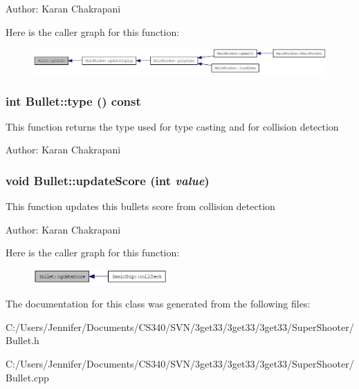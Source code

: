 Author: Karan Chakrapani 

Here is the caller graph for this function:\nopagebreak
\begin{figure}[H]
\begin{center}
\leavevmode
\includegraphics[width=396pt]{class_bullet_adf5073e03d5eb9ce5cbf2af3653d02ef_icgraph}
\end{center}
\end{figure}
\hypertarget{class_bullet_a2c7acaad02de31fa4d0e4c837a05be4f}{
\subsubsection[{type}]{\setlength{\rightskip}{0pt plus 5cm}int Bullet::type () const}}
\label{class_bullet_a2c7acaad02de31fa4d0e4c837a05be4f}
This function returns the type used for type casting and for collision detection

Author: Karan Chakrapani \hypertarget{class_bullet_a6a304710eaa8ea9337c27e827a0f2400}{
\subsubsection[{updateScore}]{\setlength{\rightskip}{0pt plus 5cm}void Bullet::updateScore (int {\em value})}}
\label{class_bullet_a6a304710eaa8ea9337c27e827a0f2400}
This function updates this bullets score from collision detection

Author: Karan Chakrapani 

Here is the caller graph for this function:\nopagebreak
\begin{figure}[H]
\begin{center}
\leavevmode
\includegraphics[width=146pt]{class_bullet_a6a304710eaa8ea9337c27e827a0f2400_icgraph}
\end{center}
\end{figure}


The documentation for this class was generated from the following files:\begin{DoxyCompactItemize}
\item 
C:/Users/Jennifer/Documents/CS340/SVN/3get33/3get33/3get33/SuperShooter/Bullet.h\item 
C:/Users/Jennifer/Documents/CS340/SVN/3get33/3get33/3get33/SuperShooter/Bullet.cpp\end{DoxyCompactItemize}
